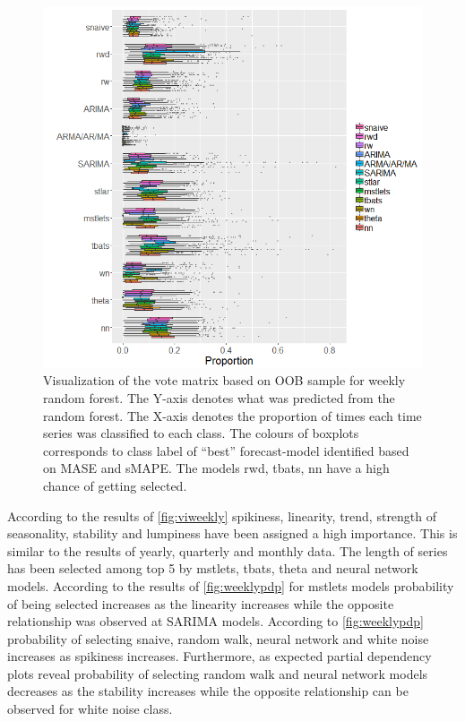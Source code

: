 \documentclass[11pt,a4paper,]{article}
\begin{document}
\begin{figure}
\centering
\includegraphics{figures/oobweekly-1.png}
\caption{\label{fig:oobweekly}Visualization of the vote matrix based on OOB
sample for weekly random forest. The Y-axis denotes what was predicted
from the random forest. The X-axis denotes the proportion of times each
time series was classified to each class. The colours of boxplots
corresponds to class label of ``best'' forecast-model identified based
on MASE and sMAPE. The models rwd, tbats, nn have a high chance of
getting selected.}
\end{figure}

\clearpage

According to the results of \autoref{fig:viweekly} spikiness, linearity,
trend, strength of seasonality, stability and lumpiness have been
assigned a high importance. This is similar to the results of yearly,
quarterly and monthly data. The length of series has been selected among
top 5 by mstlets, tbats, theta and neural network models. According to
the results of \autoref{fig:weeklypdp} for mstlets models probability of
being selected increases as the linearity increases while the opposite
relationship was observed at SARIMA models. According to
\autoref{fig:weeklypdp} probability of selecting snaive, random walk,
neural network and white noise increases as spikiness increases.
Furthermore, as expected partial dependency plots reveal probability of
selecting random walk and neural network models decreases as the
stability increases while the opposite relationship can be observed for
white noise class.
\end{document}
